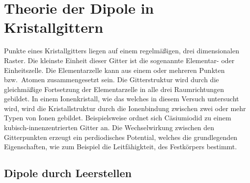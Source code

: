 \section{Theorie der Dipole in Kristallgittern}
\label{sec:theorie}

Punkte eines Kristallgitters liegen auf einem regelmäßigen, drei dimensionalen Raster.
Die kleinste Einheit dieser Gitter ist die sogenannte Elementar- oder Einheitszelle.
Die Elementarzelle kann aus einem oder mehreren Punkten bzw.\ Atomen zusammengesetzt sein.
Die Gitterstruktur wird durch die gleichmäßige Fortsetzung der Elementarzelle in alle drei Raumrichtungen gebildet.
In einem Ionenkristall, wie das welches in diesem Versuch untersucht wird,
wird die Kristallstruktur durch die Ionenbindung zwischen zwei oder mehr Typen von Ionen gebildet.
Beispielsweise ordnet sich Cäsiumiodid zu einem kubisch-innenzentrierten Gitter an.
Die Wechselwirkung zwischen den Gitterpunkten erzeugt ein perdiodisches Potential,
welches die grundlegenden Eigenschaften,
wie zum Beispiel die Leitfähigkteit, des Festkörpers bestimmt.


\subsection{Dipole durch Leerstellen}

